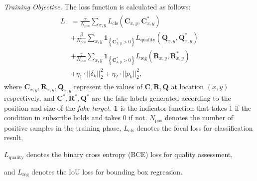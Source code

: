 \documentclass[journal]{IEEEtran}
\begin{document}
\textit{Training Objective.} The loss function is calculated as follows:
\begin{equation}
\begin{array}{l}
\begin{aligned}
L&=\frac{\alpha}{N_{\mathrm{pos}}} \sum_{x, y} L_{\mathrm{cls}}\left(\textbf{C}_{x, y}, \textbf{C}_{x, y}^{*}\right) \\
&+\frac{\beta}{N_{\mathrm{pos}}} \sum_{x, y} \textbf{1}_{\left\{\textbf{C}_{x, y}^{*}>0\right\}} L_{\mathrm{quality}}\left(\textbf{Q}_{x, y}, \textbf{Q}_{x, y}^{*}\right) \\
&+\frac{\gamma}{N_{\mathrm{pos}}} \sum_{x, y} \textbf{1}_{\left\{\textbf{C}_{x, y}^{*}>0\right\}} L_{\mathrm{reg}}\left(\textbf{R}_{x, y}, \textbf{R}_{x, y}^{*}\right) \\
&+\eta_1 \cdot ||\delta_k||_2^2 +  \eta_2 \cdot ||p_k||^2_2,
\end{aligned}
\end{array}
\label{eq:loss}
\end{equation}
where $\textbf{C}_{x, y}, \textbf{R}_{x, y}, \textbf{Q}_{x, y}$ represent the values of $\textbf{C}, \textbf{R}, \textbf{Q}$ at location $(x, y)$ respectively, and $\textbf{C}^*, \textbf{R}^*, \textbf{Q}^*$ are the fake labels generated according to the position and size of the \textit{fake target}. $\textbf 1$ is the indicator function that takes 1 if the condition in subscribe holds and takes 0 if not. $N_{\mathrm{pos}}$ denotes the number of positive samples in the training phase, $L_{\mathrm{cls}}$ denotes the focal loss \cite{focal} for classification result,

$L_{\mathrm{quality}}$ denotes the binary cross entropy (BCE) loss for quality assessment,

and $L_{\mathrm{reg}}$ denotes the IoU loss \cite{iou-loss} for bounding box regression.

 
\end{document}

